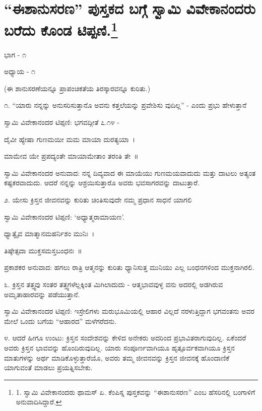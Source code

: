 
\chapter{“ಈಶಾನುಸರಣ” ಪುಸ್ತಕದ ಬಗ್ಗೆ ಸ್ವಾಮಿ ವಿವೇಕಾನಂದರು ಬರೆದು ಕೊಂಡ ಟಿಪ್ಪಣಿ.\protect\footnote{1. ಸ್ವಾಮಿ ವಿವೇಕಾನಂದರು ಥಾಮಸ್ ಏ. ಕೆಂಪಿಸ್ನ ಪುಸ್ತಕವನ್ನು “ಈಶಾನುಸರಣ” ಎಂಬ ಹೆಸರಿನಲ್ಲಿ ಬಂಗಾಳಿಗೆ ಅನುವಾದಿಸಿದ್ದಾರೆ.}}

\begin{center}
ಭಾಗ - ೧
\end{center}

\begin{center}
ಅಧ್ಯಾಯ - ೧
\end{center}

\begin{center}
(ಈ ಶಾನುಸರಣೆಯನ್ನೂ ಪ್ರಾಪಂಚಿಕತೆಯ ತಿರಸ್ಕಾರವನ್ನೂ ಕುರಿತು.)
\end{center}

೧. “ಯಾರು ನನ್ನನ್ನು ಅನುಸರಿಸುತ್ತಾನೊ ಅವನು ಕತ್ತಲೆಯನ್ನು ಪ್ರವೇಶಿಸು ವುದಿಲ್ಲ” - ಎಂದು ಪ್ರಭು ಹೇಳುತ್ತಾನೆ 

ಸ್ವಾಮಿ ವಿವೇಕಾನಂದರ ಟಿಪ್ಪಣಿ: ಭಗವದ್ಗೀತೆ ೭.೧೪ -

ದೈವೀ ಹ್ಯೇಷಾ ಗುಣಮಯೀ ಮಮ ಮಾಯಾ ದುರತ್ಯಯಾ~।

ಮಾಮೇವ ಯೇ ಪ್ರಪದ್ಯಂತೇ ಮಾಯಾಮೇತಾಂ ತರಂತಿ ತೇ~॥

ಸ್ವಾಮಿ ವಿವೇಕಾನಂದರ ಅನುವಾದ: ನನ್ನ ದಿವ್ಯವಾದ ಈ ಮಾಯೆಯು ಗುಣಮಯವಾದುದು ಮತ್ತು ದಾಟಲು ಅತ್ಯಂತ ಕಷ್ಟಕರವಾದುದು. ಆದರೆ ನನ್ನನ್ನು ಆಶ್ರಯಿಸುತ್ತಾರೊ ಅವರು ಭವಸಾಗರವನ್ನು ದಾಟುತ್ತಾರೆ.

೨. ಯೇಸು ಕ್ರಿಸ್ತನ ಜೀವನವನ್ನು ಕುರಿತು ಚಿಂತಿಸುವುದೇ ನಮ್ಮ ಪ್ರಧಾನ ಸಾಧನೆ ಯಾಗಲಿ 

ಸ್ವಾಮಿ ವಿವೇಕಾನಂದರ ಟಿಪ್ಪಣಿ: ‘ಅಧ್ಯಾತ್ಮರಾಮಾಯಣ’.

ಧ್ಯಾತ್ವೈವ ಮಾತ್ಮಾನಮಹರ್ನಿಶಂ ಮುನಿಃ~।

ತಿಷ್ಠೇತ್ಸದಾ ಮುಕ್ತಸಮಸ್ತಬಂಧನಃ~॥

ಪ್ರಕಾಶಕರ ಅನುವಾದ: ಹಗಲು ರಾತ್ರಿ ಆತ್ಮನನ್ನು ಕುರಿತು ಧ್ಯಾನಿಸುತ್ತ ಮುನಿಯು ಎಲ್ಲ ಬಂಧನಗಳಿಂದ ಮುಕ್ತನಾಗಿರಲಿ.

೩. ಕ್ರಿಸ್ತನ ತತ್ತ್ವವು ಸಂತರ ತತ್ತ್ವಗಳೆಲ್ಲಕ್ಕಿಂತ ಮಿಗಿಲಾದುದು - ಆತ್ಮಭಾವವುಳ್ಳ ವನು ಅದರಲ್ಲಿ ಅಡಗಿರುವ ಅಮೃತಾಹಾರವನ್ನು ಪಡೆಯುತ್ತಾನೆ. 

ಸ್ವಾಮಿ ವಿವೇಕಾನಂದರ ಟಿಪ್ಪಣಿ: ಇಸ್ರೇಲಿಗಳು ಮರುಭೂಮಿಯಲ್ಲಿ ಆಹಾರ ವಿಲ್ಲದೆ ನರಳುತ್ತಿದ್ದಾಗ ಭಗವಂತನು ಅವರ ಮೇಲೆ ಒಂದು ಬಗೆಯ “ಆಹಾರದ” ಮಳೆಗರೆದನು.

೪. ಆದರೆ ಹೀಗೂ ಉಂಟು: ಕ್ರಿಸ್ತನ ಸಂದೇಶವನ್ನು ಕೇಳಿದ ಅನೇಕರು ಅದರಿಂದ ಪ್ರಭಾವಿತರಾಗುವುದಿಲ್ಲ. ಏಕೆಂದರೆ ಅವರು ಕ್ರಿಸ್ತನ ಭಾವವನ್ನು ಹೊಂದಿರುವುದಿಲ್ಲ. ಯಾರು ಸಂಪೂರ್ಣವಾಗಿಯೂ ಹೃತ್ಪೂರ್ವಕವಾಗಿಯೂ ಕ್ರಿಸ್ತನ ಮಾತುಗಳನ್ನು ಅರ್ಥ ಮಾಡಿಕೊಳ್ಳುತ್ತಾರೆಯೊ, ಅವರು ತಮ್ಮ ಜೀವನವನ್ನು ಕ್ರಿಸ್ತನ ಜೀವನಕ್ಕೆ ಹೊಂದಾಣಿಕೆ ಯಾಗುವಂತೆ ಮಾಡಲು ಪ್ರಯತ್ನಿಸಬೇಕು. 


